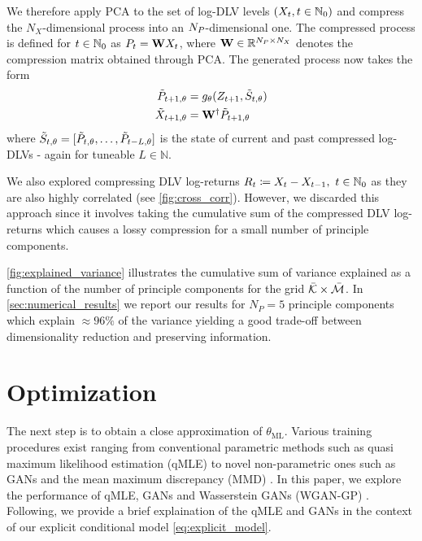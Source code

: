 \documentclass[]{article} %
\begin{document}
We therefore apply PCA to the set of log-DLV levels $(X_t, t\in\mathbb{N}_0)$ and compress the $N_X$-dimensional process into an $N_P$-dimensional one. The compressed process is defined for $t \in \mathbb{N}_0$ as $P_t = \mathbf{W} X_t$, where $\mathbf{W} \in \mathbb{R}^{N_P \times N_X}$ denotes the compression matrix obtained through PCA. The generated process now takes the form
\begin{align*}
\tilde {P}_{t+1, \theta} &= g_\theta(Z_{t+1}, \tilde S_{t, \theta})
\\
\tilde {X}_{t+1, \theta} &= \mathbf{W}_{}^\dagger\tilde {P}_{t+1, \theta}
\end{align*}
where $\tilde S_{t, \theta} = [\tilde {P}_{t, \theta}, \dots, \tilde {P}_{t-L, \theta}]$ is the state of current and past compressed log-DLVs - again for tuneable $L\in \mathbb{N}$.

We also explored compressing DLV log-returns $R_t \coloneqq X_t - X_{t-1}, \ t \in \mathbb{N}_0$ as they are also highly correlated (see \autoref{fig:cross_corr}). However, we discarded this approach since it involves taking the cumulative sum of the compressed DLV log-returns which causes a lossy compression for a small number of principle components. 

\autoref{fig:explained_variance} illustrates the cumulative sum of variance explained as a function of the number of principle components for the grid $\bar{\mathcal{K}} \times \bar{\mathcal{M}}$. In \autoref{sec:numerical_results} we report our results for $N_P = 5$ principle components which explain $\approx 96\%$ of the variance yielding a good trade-off between dimensionality reduction and preserving information. 



\section{Optimization}
The next step is to obtain a close approximation of $\theta_{\textrm{ML}}$. Various training procedures exist ranging from conventional parametric methods such as quasi maximum likelihood estimation (qMLE) to novel non-parametric ones such as GANs and the mean maximum discrepancy (MMD) \cite{Sutherland2017}. In this paper, we explore the performance of qMLE, GANs and Wasserstein GANs (WGAN-GP) \cite{Gulrajani2017}. Following, we provide a brief explaination of the qMLE and GANs in the context of our explicit conditional model \eqref{eq:explicit_model}.
\end{document}
